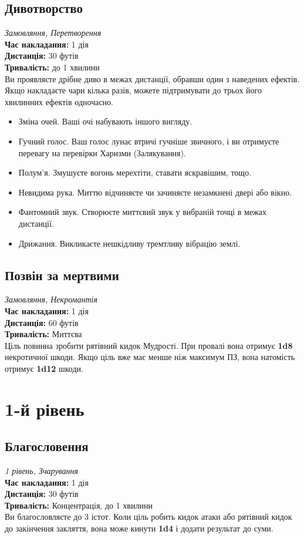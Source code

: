 \documentclass[letterpaper,openany,oneside,twocolumn]{book}
\begin{document}
\subsection*{Дивотворство}
\textit{Замовляння, Перетворення}\\
\textbf{Час накладання:} 1 дія \\
\textbf{Дистанція:} 30 футів \\
\textbf{Тривалість:} до 1 хвилини \\
Ви проявляєте дрібне диво в межах дистанції, обравши один з наведених ефектів. Якщо накладаєте чари кілька разів, можете підтримувати до трьох його хвилинних ефектів одночасно.
\begin{itemize}
    \item Зміна очей. Ваші очі набувають іншого вигляду.
    \item Гучний голос. Ваш голос лунає втричі гучніше звичного, і ви отримуєте перевагу на перевірки Харизми (Залякування).
    \item Полум’я. Змушуєте вогонь мерехтіти, ставати яскравішим, тощо.
    \item Невидима рука. Миттю відчиняєте чи зачиняєте незамкнені двері або вікно.
    \item Фантомний звук. Створюєте миттєвий звук у вибраній точці в межах дистанції.
    \item Дрижання. Викликаєте нешкідливу тремтливу вібрацію землі.
\end{itemize}

\subsection*{Позвін за мертвими}
\textit{Замовляння, Некромантія}\\
\textbf{Час накладання:} 1 дія \\
\textbf{Дистанція:} 60 футів \\
\textbf{Тривалість:} Миттєва \\
Ціль повинна зробити рятівний кидок Мудрості. При провалі вона отримує \textbf{1d8} некротичної шкоди. Якщо ціль вже має менше ніж максимум ПЗ, вона натомість отримує \textbf{1d12} шкоди.

\section*{1-й рівень}

\subsection*{Благословення}
\textit{1 рівень, Зчарування}\\
\textbf{Час накладання:} 1 дія \\
\textbf{Дистанція:} 30 футів \\
\textbf{Тривалість:} Концентрація, до 1 хвилини \\
Ви благословляєте до 3 істот. Коли ціль робить кидок атаки або рятівний кидок до закінчення закляття, вона може кинути \textbf{1d4} і додати результат до суми.
\end{document}
